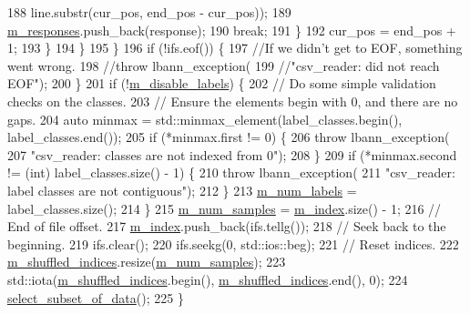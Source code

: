 \begin{DoxyCode}
188             line.substr(cur\_pos, end\_pos - cur\_pos));
189           \hyperlink{classlbann_1_1csv__reader_a8b7e23827c7cbf7c8eff40cad9cb6afc}{m\_responses}.push\_back(response);
190           \textcolor{keywordflow}{break};
191         \}
192         cur\_pos = end\_pos + 1;
193       \}
194     \}
195   \}
196   \textcolor{keywordflow}{if} (!ifs.eof()) \{
197      \textcolor{comment}{//If we didn't get to EOF, something went wrong.}
198     \textcolor{comment}{//throw lbann\_exception(}
199       \textcolor{comment}{//"csv\_reader: did not reach EOF");}
200   \}
201   \textcolor{keywordflow}{if} (!\hyperlink{classlbann_1_1csv__reader_a5f013485fc1466dcf1f78ef020b845d4}{m\_disable\_labels}) \{
202     \textcolor{comment}{// Do some simple validation checks on the classes.}
203     \textcolor{comment}{// Ensure the elements begin with 0, and there are no gaps.}
204     \textcolor{keyword}{auto} minmax = std::minmax\_element(label\_classes.begin(), label\_classes.end());
205     \textcolor{keywordflow}{if} (*minmax.first != 0) \{
206       \textcolor{keywordflow}{throw} lbann\_exception(
207         \textcolor{stringliteral}{"csv\_reader: classes are not indexed from 0"});
208     \}
209     \textcolor{keywordflow}{if} (*minmax.second != (\textcolor{keywordtype}{int}) label\_classes.size() - 1) \{
210       \textcolor{keywordflow}{throw} lbann\_exception(
211         \textcolor{stringliteral}{"csv\_reader: label classes are not contiguous"});
212     \}
213     \hyperlink{classlbann_1_1csv__reader_a8e377a058039b3d906738143356b93e4}{m\_num\_labels} = label\_classes.size();
214   \}
215   \hyperlink{classlbann_1_1csv__reader_a37ee216c31ea3d7919fce58215ec410a}{m\_num\_samples} = \hyperlink{classlbann_1_1csv__reader_a2a959e7839d2d11e2deba98ba1884006}{m\_index}.size() - 1;
216   \textcolor{comment}{// End of file offset.}
217   \hyperlink{classlbann_1_1csv__reader_a2a959e7839d2d11e2deba98ba1884006}{m\_index}.push\_back(ifs.tellg());
218   \textcolor{comment}{// Seek back to the beginning.}
219   ifs.clear();
220   ifs.seekg(0, std::ios::beg);
221   \textcolor{comment}{// Reset indices.}
222   \hyperlink{classlbann_1_1generic__data__reader_aaab6aeff67ffff1c689336851fec2c57}{m\_shuffled\_indices}.resize(\hyperlink{classlbann_1_1csv__reader_a37ee216c31ea3d7919fce58215ec410a}{m\_num\_samples});
223   std::iota(\hyperlink{classlbann_1_1generic__data__reader_aaab6aeff67ffff1c689336851fec2c57}{m\_shuffled\_indices}.begin(), \hyperlink{classlbann_1_1generic__data__reader_aaab6aeff67ffff1c689336851fec2c57}{m\_shuffled\_indices}.end(), 0);
224   \hyperlink{classlbann_1_1generic__data__reader_aa28fdeeb6af492540f507e49adff5d6c}{select\_subset\_of\_data}();
225 \}
\end{DoxyCode}
